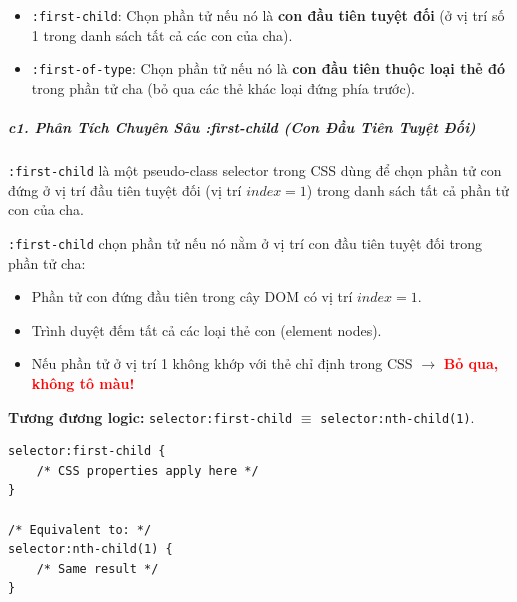 \documentclass[11pt,oneside]{book}
\newcommand{\codeinline}[1]{\textcolor{accentOrange}{\texttt{#1}}}
\begin{document}
\begin{conceptBox}
\begin{itemize}[leftmargin=1.5em, itemsep=3pt, parsep=0pt]
    \item \codeinline{:first-child}: Chọn phần tử nếu nó là \textbf{con đầu tiên tuyệt đối} (ở vị trí số 1 trong danh sách tất cả các con của cha).
    \item \codeinline{:first-of-type}: Chọn phần tử nếu nó là \textbf{con đầu tiên thuộc loại thẻ đó} trong phần tử cha (bỏ qua các thẻ khác loại đứng phía trước).
\end{itemize}
\end{conceptBox}


\subparagraph{c1. Phân Tích Chuyên Sâu :first-child (Con Đầu Tiên Tuyệt Đối)}

\codeinline{:first-child} là một pseudo-class selector trong CSS dùng để chọn phần tử con đứng ở vị trí đầu tiên tuyệt đối (vị trí $index = 1$) trong danh sách tất cả phần tử con của cha.

\begin{conceptBox}
\codeinline{:first-child} chọn phần tử nếu nó nằm ở vị trí con đầu tiên tuyệt đối trong phần tử cha:
\begin{itemize}[leftmargin=1.5em, itemsep=2pt, parsep=0pt]
    \item Phần tử con đứng đầu tiên trong cây DOM có vị trí $index = 1$.
    \item Trình duyệt đếm tất cả các loại thẻ con (element nodes).
    \item Nếu phần tử ở vị trí 1 không khớp với thẻ chỉ định trong CSS $\rightarrow$ \textcolor{red}{\textbf{Bỏ qua, không tô màu!}}
\end{itemize}
\par\vspace{4pt}
\textbf{Tương đương logic:} \codeinline{selector:first-child} $\equiv$ \codeinline{selector:nth-child(1)}.
\end{conceptBox}

\begin{codeWindow}
\begin{lstlisting}[language=CSS3]
selector:first-child {
    /* CSS properties apply here */
}

/* Equivalent to: */
selector:nth-child(1) {
    /* Same result */
}
\end{lstlisting}
\end{codeWindow}
\end{document}
